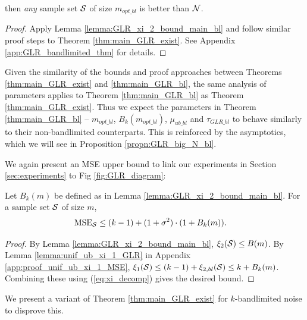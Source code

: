 {{\begin{theorem}
{    \noindent then \emph{any} sample set $\mathcal{S}$ of size $m_{opt\_bl}$ is better than $\mathcal{N}$.}
\end{theorem}
\begin{proof}
    Apply Lemma \ref{lemma:GLR_xi_2_bound_main_bl} and follow similar proof steps to Theorem \ref{thm:main_GLR_exist}. See Appendix \ref{app:GLR_bandlimited_thm} for details.
\end{proof}

Given the similarity of the bounds and proof approaches between Theorems \ref{thm:main_GLR_exist} and \ref{thm:main_GLR_bl}, the same analysis of parameters applies to Theorem \ref{thm:main_GLR_bl} as Theorem \ref{thm:main_GLR_exist}. Thus we expect the parameters in Theorem \ref{thm:main_GLR_bl} -- $m_{opt\_bl}$, $B_{k}(m_{opt\_bl})$, $\mu_{ub\_bl}$ and $\tau_{GLR\_bl}$ to behave similarly to their non-bandlimited counterparts. This is reinforced by the asymptotics, which we will see in Proposition \ref{propn:GLR_big_N_bl}.

We again present an MSE upper bound to link our experiments in Section \ref{sec:experiments} to Fig \ref{fig:GLR_diagram}:
\begin{corollary}
\label{corr:unif_ub_xi_1_MSE_bl}
    Let $B_{k}(m)$ be defined as in Lemma \ref{lemma:GLR_xi_2_bound_main_bl}. For a sample set $\mathcal{S}$ of size $m$,
    \begin{align}
    \textrm{MSE}_{\mathcal{S}} &\leq (k - 1) + (1 + \sigma^{2}) \cdot (1 + B_{k}(m)). \label{eq:unif_ub_MSE}
    \end{align}
\end{corollary}
\begin{proof}
By Lemma \ref{lemma:GLR_xi_2_bound_main_bl}, $\xi_{2}(\mathcal{S}) \leq B(m)$. By Lemma \ref{lemma:unif_ub_xi_1_GLR} in Appendix \ref{app:proof_unif_ub_xi_1_MSE}, $\xi_{1}(\mathcal{S}) \leq (k-1) + \xi_{2,bl}(\mathcal{S}) \leq k + B_{k}(m)$. Combining these using (\ref{eq:xi_decomp}) gives the desired bound.
\end{proof}
}

\iffalse
We present a variant of Theorem \ref{thm:main_GLR_exist} for $k$-bandlimited noise to disprove this.%

}
